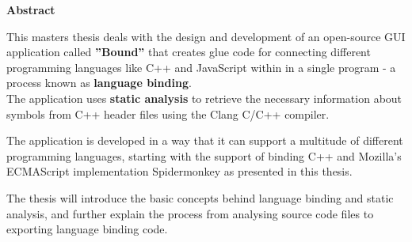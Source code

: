 \thispagestyle{empty}
\textbf{Abstract}

This masters thesis deals with the design and development of an open-source GUI application called \textbf{''Bound''} that creates glue code for connecting different programming languages like C++ and JavaScript within in a single program - a process known as \textbf{language binding}.\\
The application uses \textbf{static analysis} to retrieve the necessary information about symbols from C++ header files using the Clang C/C++ compiler.

The application is developed in a way that it can support a multitude of different programming languages, starting with the support of binding C++ and Mozilla's ECMAScript implementation Spidermonkey as presented in this thesis.

The thesis will introduce the basic concepts behind language binding and static analysis, and further explain the process from analysing source code files to exporting language binding code.
